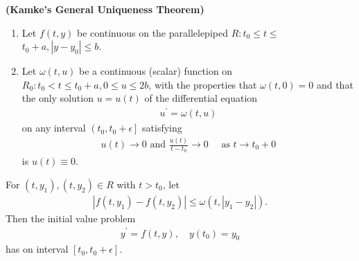 \documentclass{article}
\newcommand{\bfs}[1]{\textbf{({#1}) }}
\begin{document}
\begin{thma}\bfs{Kamke's General Uniqueness Theorem}\label{thm:kamke}
\begin{enumerate}
    \item Let $f(t, y)$ be continuous on the parallelepiped $R: t_{0} \le t \le$ $t_{0}+a,\left|y-y_{0}\right| \le b$.
    \item Let $\omega(t, u)$ be a continuous (scalar) function on $R_{0}: t_{0}<t \le t_{0}+a, 0 \le u \le 2 b$, with the properties that $\omega(t, 0)=0$ and that the only solution $u=u(t)$ of the differential equation
\begin{align}
u^{\prime}=\omega(t, u)\label{eq:mcsdf}
\end{align}
on any interval $\left(t_{0}, t_{0}+\epsilon\right]$ satisfying
\begin{align}
u(t) \rightarrow 0 \text { and } \frac{u(t)}{t-t_{0}} \rightarrow 0 \quad \text { as } t \rightarrow t_{0}+0\label{eq:cvsafdg}
\end{align}
is $u(t) \equiv 0 .$
\end{enumerate}
  For $\left(t, y_{1}\right),\left(t, y_{2}\right) \in R$ with $t>t_{0}$, let
\begin{align}
\left|f\left(t, y_{1}\right)-f\left(t, y_{2}\right)\right| \le \omega\left(t,\left|y_{1}-y_{2}\right|\right).\label{eq:dssaad}
\end{align}
Then the initial value problem
\begin{align}
y^{\prime}=f(t, y), \quad y\left(t_{0}\right)=y_{0}\label{eq:vddff}
\end{align}
has  on  interval $\left[t_{0}, t_{0}+\epsilon\right]$.
\end{thma} 
\end{document}
